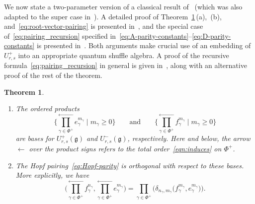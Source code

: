 \documentclass[pdftex]{sigma}
\numberwithin{equation}{section}
\newtheorem{Theorem}{Theorem}[section]
\begin{document}
We now state a two-parameter version of a classical result of~\cite{K1,K2,L,Ro} (which was also adapted to the super case in~\cite{CHW}). A detailed proof of Theorem~\ref{thm:PBW-general}\,(a),~(b), and~\eqref{eq:root-vector-pairing} is presented in~\cite[Theorem~7.1]{MT1}, and the special case of~\eqref{eq:pairing_recursion} specified in~\eqref{eq:A-parity-constants}--\eqref{eq:D-parity-constants} is presented in~\cite[Theorem~7.2]{MT1}. Both arguments make crucial use of an embedding of $U_{r,s}^{+}$ into an appropriate quantum shuffle algebra. A proof of the recursive formula~\eqref{eq:pairing_recursion} in general is given in~\cite{MT2}, along with an alternative proof of the rest of the theorem.

\begin{Theorem}\label{thm:PBW-general}\samepage \quad
\begin{enumerate}\itemsep=0pt
\item[$(a)$] The ordered products
\begin{displaymath}
 \Biggl\{ \overset{\longleftarrow}{\underset{\gamma \in \Phi^{+}}{\prod}} e_{\gamma}^{m_{\gamma}} \mid m_{\gamma} \ge 0 \Biggr\}\qquad \text{and}\qquad \Biggl\{\overset{\longleftarrow}{\underset{\gamma \in \Phi^{+}}{\prod}}f_{\gamma}^{m_{\gamma}} \mid m_{\gamma} \ge 0\Biggr\}
\end{displaymath}
are bases for $U_{r,s}^{+}(\mathfrak{g})$ and $U_{r,s}^{-}(\mathfrak{g})$, respectively. Here and below, the arrow $\leftarrow$ over the product signs refers to the total order~\eqref{eqn:induces} on $\Phi^+$.


\item[$(b)$] The Hopf pairing~\eqref{eq:Hopf-parity} is orthogonal with respect to these bases. More explicitly, we have
\begin{displaymath}
 \Biggl(\overset{\longleftarrow}{\underset{\gamma \in \Phi^{+}}{\prod}} f_{\gamma}^{n_{\gamma}}, \overset{\longleftarrow}{\underset{\gamma \in \Phi^{+}}{\prod}} e_{\gamma}^{m_{\gamma}}\Biggr)=
 \prod_{\gamma\in \Phi^+} \bigl(\delta_{n_\gamma,m_\gamma} \bigl(f_{\gamma}^{m_\gamma},e^{m_\gamma}_\gamma\bigr)\bigr).
\end{displaymath}



\end{enumerate}
\end{Theorem}
\end{document}
